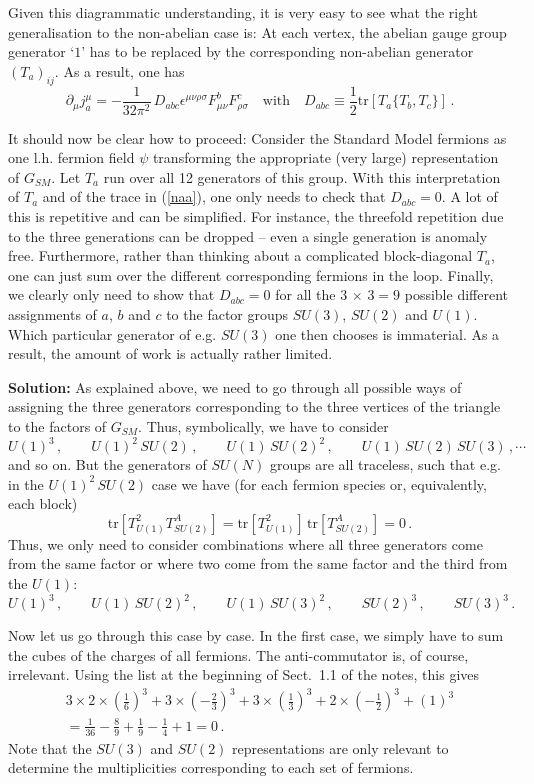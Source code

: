 \documentclass[12pt]{article}
\newcommand{\be}{\begin{equation}}
\newcommand{\ee}{\end{equation}}
\newcommand{\bea}{\begin{eqnarray}}
\newcommand{\eea}{\end{eqnarray}}
\numberwithin{equation}{section}
\begin{document}
Given this diagrammatic understanding, it is very easy to see what the right generalisation to the non-abelian case is: At each vertex, the abelian gauge group generator `$1$' has to be replaced by the corresponding non-abelian generator $(T_a)_{ij}$. As a result, one has
\be
\partial_\mu j^\mu_a=-\frac{1}{32\pi^2}\,D_{abc}\epsilon^{\mu\nu\rho\sigma}
F_{\mu\nu}^b F_{\rho\sigma}^c\quad\mbox{with}\quad D_{abc}\equiv\frac{1}{2}\mbox{tr} [T_a\{T_b,T_c\}]\,.
\label{naa}
\ee

It should now be clear how to proceed: Consider the Standard Model fermions as one l.h. fermion field $\psi$ transforming the appropriate (very large) representation of $G_{SM}$. Let $T_a$ run over all 12 generators of this group. With this interpretation of $T_a$ and of the trace in (\ref{naa}), one only needs to check that $D_{abc}=0$. A lot of this is repetitive and can be simplified. For instance, the threefold repetition due to the three generations can be dropped -- even a single generation is anomaly free. Furthermore, rather than thinking about a complicated block-diagonal $T_a$, one can just sum over the different corresponding fermions in the loop. Finally, we clearly only need to show that $D_{abc}=0$ for all the 3$\,\times\, 3=9$ possible different assignments of $a$, $b$ and $c$ to the factor groups $SU(3)$, $SU(2)$ and $U(1)$. Which particular generator of e.g. $SU(3)$ one then chooses is immaterial. As a result, the amount of work is actually rather limited.

\noindent
{\bf Solution:} As explained above, we need to go through all possible ways of assigning the three generators corresponding to the three vertices of the triangle to the factors of $G_{SM}$. Thus, symbolically, we have to consider
\be
U(1)^3\,,\qquad U(1)^2\,SU(2)\,,\qquad U(1)\,SU(2)^2\,,\qquad U(1)\,SU(2)\,SU(3)\,,\cdots
\ee
and so on. But the generators of $SU(N)$ groups are all traceless, such that e.g. in the $U(1)^2\,SU(2)$ case we have (for each fermion species or, equivalently, each block)
\be
\mbox{tr}[T_{U(1)}^2 T^A_{SU(2)}]=\mbox{tr}[T_{U(1)}^2]\,\mbox{tr} [T^A_{SU(2)}]=0\,.
\ee
Thus, we only need to consider combinations where all three generators come from the same factor or where two come from the same factor and the third from the $U(1)$:
\be
U(1)^3\,,\qquad U(1)\,SU(2)^2\,,\qquad U(1)\,SU(3)^2\,,\qquad SU(2)^3\,,\qquad SU(3)^3\,.
\ee

Now let us go through this case by case. In the first case, we simply have to sum the cubes of the charges of all fermions. The anti-commutator is, of course, irrelevant. Using the list at the beginning of Sect.~1.1 of the notes, this gives
\bea
&3\times 2\times \left(\frac{1}{6}\right)^3
+3\times \left(-\frac{2}{3}\right)^3
+3\times \left(\frac{1}{3}\right)^3
+2\times \left(-\frac{1}{2}\right)^3
+\left(1\right)^3&\nonumber
\\
&=\frac{1}{36}-\frac{8}{9}+\frac{1}{9}-\frac{1}{4}+1=0\,.&
\eea
Note that the $SU(3)$ and $SU(2)$ representations are only relevant to determine the multiplicities corresponding to each set of fermions. 
\end{document}
